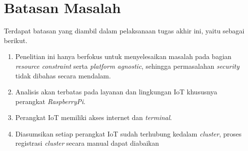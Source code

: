 \section{Batasan Masalah}
\label{sec:batasan-masalah}

Terdapat batasan yang diambil dalam pelaksanaan tugas akhir ini, yaitu sebagai berikut.

\begin{enumerate}
  \item Penelitian ini hanya berfokus untuk menyelesaikan masalah pada bagian \textit{resource constraint} serta \textit{platform agnostic}, sehingga permasalahan \textit{security} tidak dibahas secara mendalam.
  \item Analisis akan terbatas pada layanan dan lingkungan IoT khususnya perangkat \textit{RaspberryPi}.
  \item Perangkat IoT memiliki akses internet dan \textit{terminal}.
  \item Diasumsikan setiap perangkat IoT sudah terhubung kedalam \textit{cluster}, proses registrasi \textit{cluster} secara manual dapat diabaikan
\end{enumerate}

